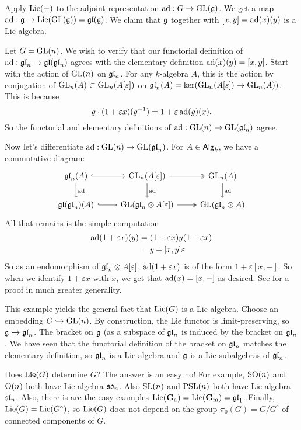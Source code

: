 Apply $\operatorname{Lie}(-)$ to the adjoint representation $\operatorname{ad}:G\to \operatorname{GL}(\mathfrak{g})$. We 
get a map $\operatorname{ad}:\mathfrak{g}\to \operatorname{Lie}(\operatorname{GL}(\mathfrak{g}))=\mathfrak{gl}(\mathfrak{g})$. We claim that 
$\mathfrak{g}$ together with $[x,y]=\operatorname{ad}(x)(y)$ is a Lie algebra. 

\begin{example}
Let $G=\operatorname{GL}(n)$. We wish to verify that our functorial definition of 
$\operatorname{ad}:\mathfrak{gl}_n\to \mathfrak{gl}(\mathfrak{gl}_n)$ agrees with the elementary definition 
$\operatorname{ad}(x)(y)=[x,y]$. Start with the action of $\operatorname{GL}(n)$ on 
$\mathfrak{gl}_n$. For any $k$-algebra $A$, this is the action by conjugation of 
$\operatorname{GL}_n(A)\subset \operatorname{GL}_n(A[\varepsilon])$ on 
$\mathfrak{gl}_n(A)=\ker(\operatorname{GL}_n(A[\varepsilon])\to \operatorname{GL}_n(A))$. This is because 
\[
  g\cdot (1+\varepsilon x)(g^{-1}) = 1+\varepsilon \operatorname{ad}(g)(x) .
\]
So the functorial and elementary definitions of $\operatorname{ad}:\operatorname{GL}(n)\to \operatorname{GL}(\mathfrak{gl}_n)$ 
agree. 

Now let's differentiate $\operatorname{ad}:\operatorname{GL}(n)\to \operatorname{GL}(\mathfrak{gl}_n)$. For 
$A\in \mathsf{Alg}_{k}$, we have a commutative diagram:
\[\begin{tikzcd}
  \gl_n(A) \ar[r, hook] \ar[d, "\adjoint"] 
    & \GL_n(A[\varepsilon]) \ar[r, twoheadrightarrow] \ar[d, "\adjoint"]
    & \GL_n(A) \ar[d, "\adjoint"] \\
  \gl(\gl_n)(A) \ar[r, hook]
    & \GL(\gl_n\otimes A[\varepsilon]) \ar[r, twoheadrightarrow] 
    & \GL(\gl_n\otimes A)
\end{tikzcd}\]
All that remains is the simple computation 
\begin{align*}
  \operatorname{ad}(1+ \varepsilon x)(y)
    &= (1+\varepsilon x)y(1-\varepsilon x) \\
    &= y+[x,y]\varepsilon
\end{align*}
So as an endomorphism of $\mathfrak{gl}_n\otimes A[\varepsilon]$, 
$\operatorname{ad}(1+\varepsilon x)$ is of the form $1+\varepsilon [x,-]$. So when we 
identify $1+\varepsilon x$ with $x$, we get that $\operatorname{ad}(x)=[x,-]$ as 
desired. See \cite[II 4.8]{sga3-i} for a proof in much greater generality. 
\end{example}

This example yields the general fact that $\operatorname{Lie}(G)$ is a Lie algebra. Choose an 
embedding $G\hookrightarrow \operatorname{GL}(n)$. By construction, the Lie functor is 
limit-preserving, so $\mathfrak{g}\hookrightarrow \mathfrak{gl}_n$. The bracket on $\mathfrak{g}$ (as a subspace of 
$\mathfrak{gl}_n$ is induced by the bracket on $\mathfrak{gl}_n$. We have seen that the functorial 
definition of the bracket on $\mathfrak{gl}_n$ matches the elementary definition, so 
$\mathfrak{gl}_n$ is a Lie algebra and $\mathfrak{g}$ is a Lie subalgebras of $\mathfrak{gl}_n$. 

Does $\operatorname{Lie}(G)$ determine $G$? The answer is an easy no! For example, 
$\operatorname{SO}(n)$ and $\operatorname{O}(n)$ both have Lie algebra $\mathfrak{so}_n$. Also 
$\operatorname{SL}(n)$ and $\operatorname{PSL}(n)$ both have Lie algebra $\mathfrak{sl}_n$. Also, there is are the 
easy examples $\operatorname{Lie}(\mathbf{G}_\mathrm{a})=\operatorname{Lie}(\mathbf{G}_\mathrm{m})=\mathfrak{gl}_1$. Finally, 
$\operatorname{Lie}(G)=\operatorname{Lie}(G^\circ)$, so $\operatorname{Lie}(G)$ does not depend on the group 
$\pi_0(G)=G/G^\circ$ of connected components of $G$. 





